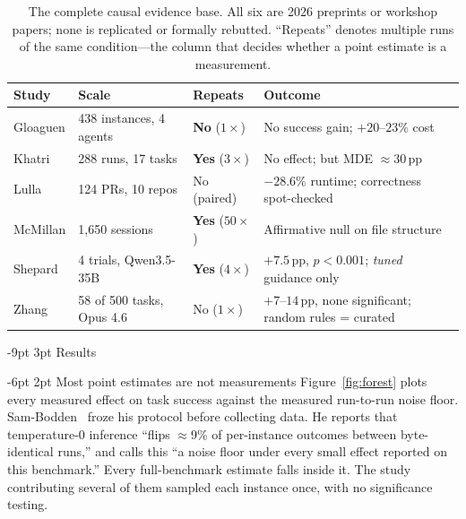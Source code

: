 \documentclass[10pt,twocolumn,a4paper]{article}
\makeatletter
\renewcommand\section{\@startsection{section}{1}{\z@}%
  {-9pt \@plus -2pt \@minus -1pt}{3pt}%
  {\normalfont\large\bfseries\color{acc}}}
\renewcommand\subsection{\@startsection{subsection}{2}{\z@}%
  {-6pt \@plus -1pt \@minus -1pt}{2pt}%
  {\normalfont\normalsize\bfseries}}
\makeatother
\begin{document}
\begin{table}[t]
\centering\small
\caption{The complete causal evidence base. All six are 2026 preprints or
workshop papers; none is replicated or formally rebutted. ``Repeats'' denotes
multiple runs of the same condition---the column that decides whether a point
estimate is a measurement.}
\label{tab:base}
\begin{tabular}{@{}R{1.32cm}R{1.78cm}R{1.02cm}R{2.62cm}@{}}
\toprule
\textbf{Study} & \textbf{Scale} & \textbf{Repeats} & \textbf{Outcome} \\
\midrule
Gloaguen \cite{gloaguen} & 438 instances, 4 agents & \textbf{No} ($1\times$) & No success gain; $+20$--$23\%$ cost \\
\addlinespace[1pt]
Khatri \cite{khatri} & 288 runs, 17 tasks & \textbf{Yes} ($3\times$) & No effect; but MDE $\approx$30\,pp \\
\addlinespace[1pt]
Lulla \cite{lulla} & 124 PRs, 10 repos & No (paired) & $-28.6\%$ runtime; correctness spot-checked \\
\addlinespace[1pt]
McMillan \cite{mcmillan} & 1{,}650 sessions & \textbf{Yes} ($50\times$) & Affirmative null on file structure \\
\addlinespace[1pt]
Shepard \cite{shepard} & 4 trials, Qwen3.5-35B & \textbf{Yes} ($4\times$) & $+7.5$\,pp, $p<0.001$; \emph{tuned} guidance only \\
\addlinespace[1pt]
Zhang \cite{zhang} & 58 of 500 tasks, Opus 4.6 & No ($1\times$) & $+7$--$14$\,pp, none significant; random rules = curated \\
\bottomrule
\end{tabular}
\end{table}

\section{Results}

\subsection{Most point estimates are not measurements}
Figure~\ref{fig:forest} plots every measured effect on task success against the
measured run-to-run noise floor. Sam-Bodden~\cite{sambodden} froze his protocol
before collecting data. He reports that temperature-0 inference ``flips
$\approx$9\% of per-instance outcomes between byte-identical runs,'' and calls this
``a noise floor under every small effect reported on this benchmark.'' Every
full-benchmark estimate falls inside it. The study contributing several of them
sampled each instance once, with no significance testing.
\end{document}
